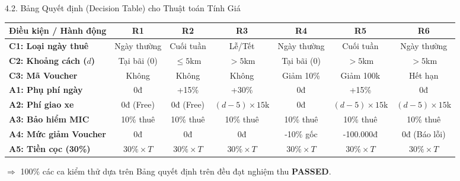 \documentclass[aspectratio=169,10pt]{beamer}
\begin{document}
\begin{frame}{4.2. Bảng Quyết định (Decision Table) cho Thuật toán Tính Giá}
  \begin{table}[ht]
    \centering\fontsize{6pt}{7.5pt}\selectfont
    \begin{tabularx}{\textwidth}{p{2.6cm}cccccc}
      \toprule
      \textbf{Điều kiện / Hành động} & \textbf{R1} & \textbf{R2} & \textbf{R3} & \textbf{R4} & \textbf{R5} & \textbf{R6} \\
      \midrule
      \textbf{C1: Loại ngày thuê} & Ngày thường & Cuối tuần & Lễ/Tết & Ngày thường & Cuối tuần & Ngày thường \\
      \textbf{C2: Khoảng cách ($d$)} & Tại bãi ($0$) & $\le 5$km & $> 5$km & Tại bãi ($0$) & $> 5$km & $> 5$km \\
      \textbf{C3: Mã Voucher} & Không & Không & Không & Giảm 10\% & Giảm 100k & Hết hạn \\
      \midrule
      \textbf{A1: Phụ phí ngày} & 0đ & +15\% & +30\% & 0đ & +15\% & 0đ \\
      \textbf{A2: Phí giao xe} & 0đ (Free) & 0đ (Free) & $(d-5)\times 15$k & 0đ & $(d-5)\times 15$k & $(d-5)\times 15$k \\
      \textbf{A3: Bảo hiểm MIC} & 10\% thuê & 10\% thuê & 10\% thuê & 10\% thuê & 10\% thuê & 10\% thuê \\
      \textbf{A4: Mức giảm Voucher} & 0đ & 0đ & 0đ & -10\% gốc & -100.000đ & 0đ (Báo lỗi) \\
      \textbf{A5: Tiền cọc (30\%)} & $30\% \times T$ & $30\% \times T$ & $30\% \times T$ & $30\% \times T$ & $30\% \times T$ & $30\% \times T$ \\
      \bottomrule
    \end{tabularx}
  \end{table}
  \begin{center}
    \footnotesize $\Rightarrow$ 100\% các ca kiểm thử dựa trên Bảng quyết định trên đều đạt nghiệm thu \textbf{PASSED}.
  \end{center}
\end{frame}
\end{document}
